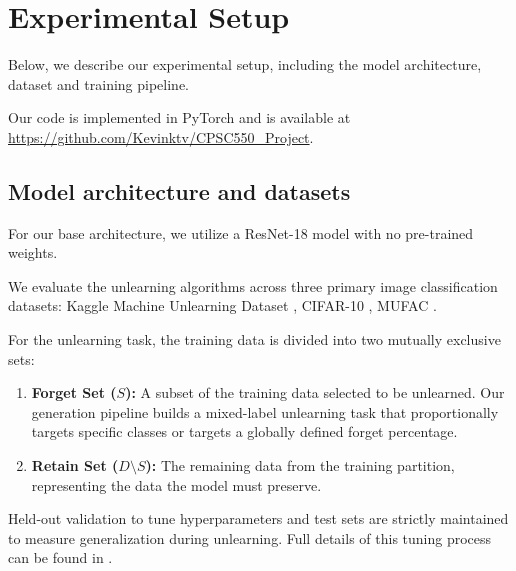 \documentclass{article}
\begin{document}
\section{Experimental Setup}
Below, we describe our experimental setup, including the model architecture, dataset and training pipeline.

Our code is implemented in PyTorch and is available at \url{https://github.com/Kevinktv/CPSC550_Project}.

\subsection{Model architecture and datasets}
For our base architecture, we utilize a ResNet-18 model with no pre-trained weights. 

We evaluate the unlearning algorithms across three primary image classification datasets: Kaggle Machine Unlearning Dataset \citep{neurips-2023-machine-unlearning}, CIFAR-10 \citep{Krizhevsky09learningmultiple}, MUFAC \citep{choi2023machine}.

For the unlearning task, the training data is divided into two mutually exclusive sets:
\begin{enumerate}
    \item \textbf{Forget Set ($S$):} A subset of the training data selected to be unlearned. Our generation pipeline builds a mixed-label unlearning task that proportionally targets specific classes or targets a globally defined forget percentage.
    \item \textbf{Retain Set ($D \setminus S$):} The remaining data from the training partition, representing the data the model must preserve.
\end{enumerate}

Held-out validation to tune hyperparameters and test sets are strictly maintained to measure generalization during unlearning. Full details of this tuning process can be found in .
\end{document}
